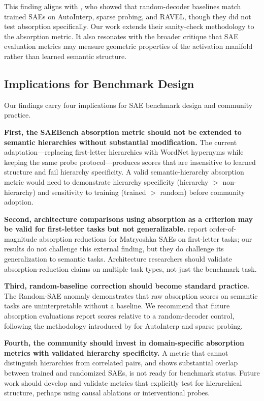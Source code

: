 \documentclass{article}
\begin{document}
This finding aligns with \citet{korznikov2026ortsae}, who showed that random-decoder baselines match trained SAEs on AutoInterp, sparse probing, and RAVEL, though they did not test absorption specifically. Our work extends their sanity-check methodology to the absorption metric. It also resonates with the broader critique that SAE evaluation metrics may measure geometric properties of the activation manifold rather than learned semantic structure.

\subsection{Implications for Benchmark Design}

Our findings carry four implications for SAE benchmark design and community practice.

\textbf{First, the SAEBench absorption metric should not be extended to semantic hierarchies without substantial modification.} The current adaptation---replacing first-letter hierarchies with WordNet hypernyms while keeping the same probe protocol---produces scores that are insensitive to learned structure and fail hierarchy specificity. A valid semantic-hierarchy absorption metric would need to demonstrate hierarchy specificity (hierarchy $>$ non-hierarchy) and sensitivity to training (trained $>$ random) before community adoption.

\textbf{Second, architecture comparisons using absorption as a criterion may be valid for first-letter tasks but not generalizable.} \citet{bussmann2025matryoshka} report order-of-magnitude absorption reductions for Matryoshka SAEs on first-letter tasks; our results do not challenge this external finding, but they do challenge its generalization to semantic tasks. Architecture researchers should validate absorption-reduction claims on multiple task types, not just the benchmark task.

\textbf{Third, random-baseline correction should become standard practice.} The Random-SAE anomaly demonstrates that raw absorption scores on semantic tasks are uninterpretable without a baseline. We recommend that future absorption evaluations report scores relative to a random-decoder control, following the methodology introduced by \citet{korznikov2026ortsae} for AutoInterp and sparse probing.

\textbf{Fourth, the community should invest in domain-specific absorption metrics with validated hierarchy specificity.} A metric that cannot distinguish hierarchies from correlated pairs, and shows substantial overlap between trained and randomized SAEs, is not ready for benchmark status. Future work should develop and validate metrics that explicitly test for hierarchical structure, perhaps using causal ablations or interventional probes.
\end{document}
